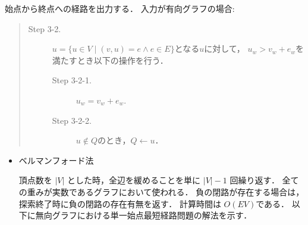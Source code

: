 \documentclass[12pt]{optlab-bachelor}
\begin{document}
始点から終点への経路を出力する．
入力が有向グラフの場合:
\begin{quote}
\begin{description}
\item[Step 3-2.] $u = \{ u \in V \mid (v,u) = e \land e \in E \}$となる$u$に対して，
$u_w > v_w + e_w$を満たすとき以下の操作を行う．
\begin{description}
  \item[Step 3-2-1.] $u_w = v_w + e_w$.
  \item[Step 3-2-2.] $u \notin Q$のとき，$Q \leftarrow u$．
\end{description}
\end{description}
\end{quote}

\begin{itemize}
  \item ベルマンフォード法

  頂点数を $|V|$ とした時，全辺を緩めることを単に $|V|-1$ 回繰り返す．
  全ての重みが実数であるグラフにおいて使われる．
  負の閉路が存在する場合は，探索終了時に負の閉路の存在有無を返す．
  計算時間は $O(EV)$である．
  以下に無向グラフにおける単一始点最短経路問題の解法を示す．


\end{itemize}
\end{document}
